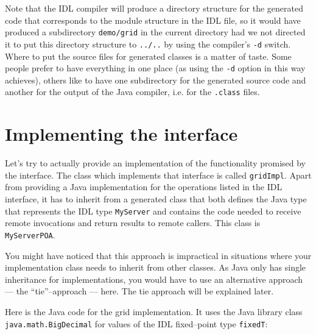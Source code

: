 \documentclass[12pt]{scrbook}
\begin{document}
Note that the IDL compiler  will produce a directory structure for the
generated code  that corresponds  to the module  structure in  the IDL
file, so it would have  produced a subdirectory {\tt demo/grid} in the
current  directory  had we  not  directed  it  to put  this  directory
structure  to {\tt  ../..} by  using the  compiler's {\tt  -d} switch.
Where to  put the source  files for generated  classes is a  matter of
taste.  Some people  prefer to have everything in  one place (as using
the {\tt  -d} option in  this way achieves),  others like to  have one
subdirectory for the generated source  code and another for the output
of the Java compiler, i.e. for the {\tt .class} files.


\section{Implementing the interface}

Let's try  to actually provide an implementation  of the functionality
promised by  the interface. The class which  implements that interface
is called {\tt gridImpl}.   Apart from providing a Java implementation
for the operations listed in the IDL interface, it has to inherit from
a generated class that both  defines the Java type that represents the
IDL type {\tt MyServer} and contains the code needed to receive remote
invocations and return results to  remote callers.  This class is {\tt
MyServerPOA}.

You might have noticed that this approach is impractical in situations
where your  implementation class needs to inherit  from other classes.
As  Java only has  single inheritance  for implementations,  you would
have  to use  an alternative  approach ---  the  ``tie''--approach ---
here. The tie approach will be explained later.

Here is  the Java code for  the grid implementation. It  uses the Java
library  class  {\tt  java.math.BigDecimal}  for  values  of  the  IDL
fixed--point type {\tt fixedT}:
\end{document}
